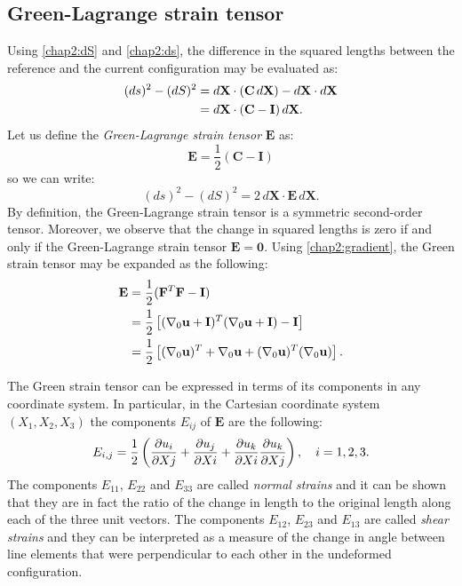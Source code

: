 	\subsection{Green-Lagrange strain tensor}
Using \eqref{chap2:dS} and \eqref{chap2:ds}, \ON the difference in the squared lengths between the reference and the current configuration may be evaluated as: \OFF 
\begin{align}
(ds)^2 - (dS)^2 &= d\mathbf{X} \cdot (\mathbf{C} \, d\mathbf{X}) - d\mathbf{X} \cdot d\mathbf{X} \notag \\
&= d\mathbf{X} \cdot  (\mathbf{C} - \mathbf{I}) \, d\mathbf{X}.
\end{align}
Let us define the \emph{Green-Lagrange strain tensor} $\mathbf{E}$ as:
\begin{equation}
\mathbf{E} = \frac{1}{2}	 (\mathbf{C} - \mathbf{I})
\end{equation}
so we can write:
\begin{equation}
(ds)^2 - (dS)^2 = 2 \, d\mathbf{X} \cdot \mathbf{E} \, d\mathbf{X}.
\end{equation}
By definition, the Green-Lagrange strain tensor is a symmetric second-order tensor. \ON Moreover, we observe that \OFF the change in squared lengths is zero if and only if \ON the Green-Lagrange strain tensor \OFF $\mathbf{E} = \mathbf{0}$. Using \eqref{chap2:gradient}, the Green strain tensor may be expanded as the following:
\begin{align}
\mathbf{E} &= \frac{1}{2} (\mathbf{F}^T \mathbf{F} - \mathbf{I}) \notag \\
&= \frac{1}{2} \left[ (\nabla_{0} \mathbf{u} + \mathbf{I})^T (\nabla_{0} \mathbf{u} + \mathbf{I}) - \mathbf{I} \right] \notag \\
&= \frac{1}{2} \left[ (\nabla_{0} \mathbf{u})^T  + \nabla_{0} \mathbf{u}+ (\nabla_{0} \mathbf{u})^T(\nabla_{0} \mathbf{u}) \right]. \label{chap2:GreenTensor}
\end{align}

The Green strain tensor can be expressed in terms of its components in any coordinate system. In particular, in the Cartesian coordinate system $(X_1, X_2, X_3)$ the components $E_{ij}$ of $\mathbf{E}$ are the following:
\begin{equation}
E_{i,j} = \frac{1}{2} \left( \dfrac{\partial u_i}{\partial Xj} + \dfrac{\partial u_j}{\partial Xi} + \dfrac{\partial u_k}{\partial Xi} \dfrac{\partial u_k}{\partial Xj} \right), \quad i = 1, 2, 3.
\end{equation}
The components $E_{11}$, $E_{22}$ and $E_{33}$ are called \emph{normal strains} and it can be shown that they are in fact the ratio of the change in length to the original length along each of the three unit vectors. The components $E_{12}$, $E_{23}$ and $E_{13}$ are called \emph{shear strains} and they can be interpreted as a measure of the change in angle between line elements that were perpendicular to each other in the undeformed configuration. 

